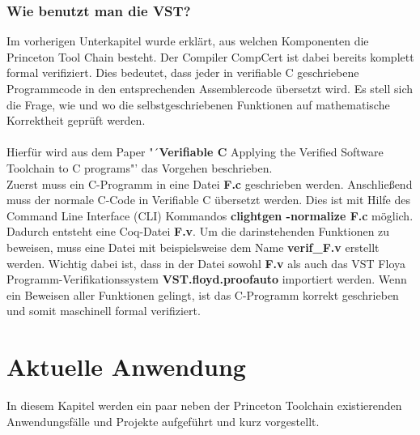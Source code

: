 \subsubsection{Wie benutzt man die VST?}
Im vorherigen Unterkapitel wurde erklärt, aus welchen Komponenten die Princeton Tool Chain besteht. Der Compiler CompCert ist dabei bereits komplett formal verifiziert. Dies bedeutet, dass jeder in verifiable C geschriebene Programmcode in den entsprechenden Assemblercode übersetzt wird. Es stell sich die Frage, wie und wo die selbstgeschriebenen Funktionen auf mathematische Korrektheit geprüft werden.\\
\\
{Hierfür wird aus dem Paper "´\textbf{Verifiable C} Applying the Verified Software Toolchain to C programs"' das Vorgehen beschrieben.\\
Zuerst muss ein C-Programm in eine Datei \textbf{F.c} geschrieben werden. Anschließend muss der normale C-Code in Verifiable C übersetzt werden. Dies ist mit Hilfe des Command Line Interface (CLI) Kommandos \textbf{clightgen -normalize F.c} möglich. Dadurch entsteht eine Coq-Datei \textbf{F.v}. Um die darinstehenden Funktionen zu beweisen, muss eine Datei mit beispielsweise dem Name \textbf{verif\_F.v} erstellt werden. Wichtig dabei ist, dass in der Datei sowohl \textbf{F.v} als auch das VST Floya Programm-Verifikationssystem \textbf{VST.floyd.proofauto} importiert werden. Wenn ein Beweisen aller Funktionen gelingt, ist das C-Programm korrekt geschrieben und somit maschinell formal verifiziert.}\cite{Appel01:VST}


\section{Aktuelle Anwendung}
\label{s:current-usage}
In diesem Kapitel werden ein paar neben der Princeton Toolchain existierenden Anwendungsfälle und Projekte aufgeführt und kurz vorgestellt.

